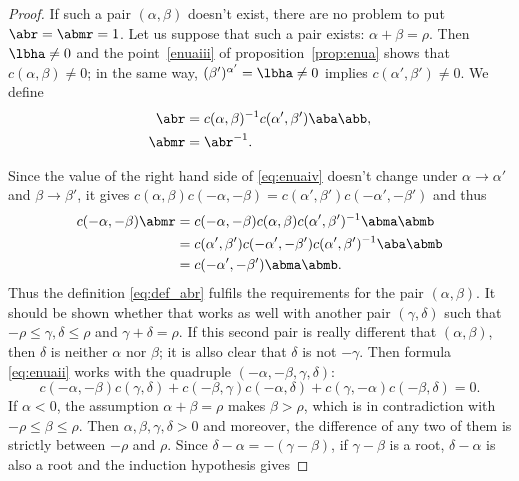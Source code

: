 \begin{proof}
	If such a pair $(\alpha,\beta)$ doesn't exist, there are no problem to put $\abr=\abmr=1$. Let us suppose that such a pair exists: $\alpha+\beta=\rho$. Then $\lbha\neq 0$ and the point~\ref{enuaiii} of proposition~\ref{prop:enua} shows that $c(\alpha,\beta)\neq 0$; in the same way, $(\beta')^{\alpha'}=\lbha\neq 0$ implies $c(\alpha',\beta')\neq 0$. We define
	\begin{subequations}\label{eq:def_abr}
		\begin{align}
			\abr  & =c(\alpha,\beta)^{-1} c(\alpha',\beta')\aba\abb, \\
			\abmr & =\abr^{-1}.
		\end{align}
	\end{subequations}


	Since the value of the right hand side of \eqref{eq:enuaiv} doesn't change under $\alpha\to\alpha'$ and $\beta\to\beta'$, it gives  $c(\alpha,\beta)c(-\alpha,-\beta)=c(\alpha',\beta')c(-\alpha',-\beta')$ and thus
	\begin{equation}
		\begin{split}
			c(-\alpha,-\beta)\abmr&=c(-\alpha,-\beta)c(\alpha,\beta)c(\alpha',\beta')^{-1}\abma\abmb\\
			&=c(\alpha',\beta')c(-\alpha',-\beta')c(\alpha',\beta')^{-1}\aba\abmb\\
			&=c(-\alpha',-\beta')\abma\abmb.
		\end{split}
	\end{equation}
	Thus the definition \eqref{eq:def_abr} fulfils the requirements for the pair $(\alpha,\beta)$. It should be shown whether that works as well with another pair $(\gamma,\delta)$ such that $-\rho\leq\gamma,\delta\leq\rho$ and $\gamma+\delta=\rho$. If this second pair is really different that $(\alpha,\beta)$, then $\delta$ is neither $\alpha$ nor $\beta$; it is allso clear that $\delta$ is not $-\gamma$. Then formula \eqref{eq:enuaii}  works with the quadruple $(-\alpha,-\beta,\gamma,\delta)$:
	\begin{equation}\label{eq:c_un}
		c(-\alpha,-\beta)c(\gamma,\delta)+c(-\beta,\gamma)c(-\alpha,\delta)+c(\gamma,-\alpha)c(-\beta,\delta)=0.
	\end{equation}
	If $\alpha<0$, the assumption $\alpha+\beta=\rho$ makes $\beta>\rho$, which is in contradiction with $-\rho\leq\beta\leq\rho$. Then $\alpha,\beta,\gamma,\delta>0$ and moreover, the difference of any two of them is strictly between $-\rho$ and $\rho$. Since $\delta-\alpha=-(\gamma-\beta)$, if $\gamma-\beta$ is a root, $\delta-\alpha$ is also a root and the induction hypothesis gives

\end{proof}
